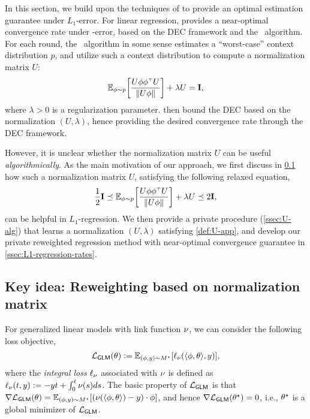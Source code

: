 



In this section, we build upon the techniques of \citet{chen2024private} to provide an optimal estimation guarantee under $L_1$-error. 
For linear regression, \citet{chen2024private} provides a near-optimal convergence rate under \Lone-error, based on the DEC framework and the \ExO~algorithm. For each round, the \ExO~algorithm in some sense estimates a ``worst-case'' context distribution $p$, and \citet{chen2024private} utilize such a context distribution to compute a normalization matrix $U$:
\begin{align}\label{def:U}
    \mathbb{E}_{\phi\sim p}{\left[  \frac{U\phi\phi^{{\scriptscriptstyle\top}} U}{\left\|U\phi\right\|}  \right]}+\lambda U=\mathbf{I},
\end{align}
where $\lambda>0$ is a regularization parameter. \citet{chen2024private} then bound the DEC based on the normalization $(U,\lambda)$, hence providing the desired convergence rate through the DEC framework.

However, it is unclear whether the normalization matrix $U$ can be useful \emph{algorithmically}.
As the main motivation of our approach, we first discuss in \cref{ssec:U-intuition} how such a normalization matrix $U$, satisfying the following relaxed equation,
\begin{align}\label{def:U-app}
    \frac12\mathbf{I}\preceq \mathbb{E}_{\phi\sim p}{\left[  \frac{U\phi\phi^{{\scriptscriptstyle\top}} U}{\left\|U\phi\right\|}  \right]}+\lambda U\preceq 2\mathbf{I},
\end{align}
can be helpful in $L_1$-regression. We then provide a private procedure (\cref{ssec:U-alg}) that learns a normalization $(U,\lambda)$ satisfying \eqref{def:U-app}, and develop our private reweighted regression method with near-optimal convergence guarantee in \cref{ssec:L1-regression-rates}.


\subsection{Key idea: Reweighting based on normalization matrix}\label{ssec:U-intuition}


For generalized linear models with link function $\nu$, we can consider the following loss objective,
\begin{align*}%
\textstyle
    \Lgl(\theta)\defeq \Exy{ \ellg(\lr \x,\theta\rr, y) },
\end{align*}
where the \emph{integral loss} $\ell_{\nu}$ associated with $\nu$ is defined as $\ell_{\nu}(t,y)\mathrel{\mathop:}= -yt+\int_{0}^t \nu(s)ds$. The basic property of $\mathcal{L}_{\mathsf{GLM}}$ is that $\nabla \mathcal{L}_{\mathsf{GLM}}(\theta)=\mathbb{E}_{(\phi,y)\sim M^\star}{\left[  {\left( \nu(\langle \phi,\theta \rangle) -y  \right)}\cdot \phi  \right]}$,
and hence $\nabla \mathcal{L}_{\mathsf{GLM}}(\theta^\star)=0$, i.e., $\theta^\star$ is a global minimizer of $\mathcal{L}_{\mathsf{GLM}}$. %


